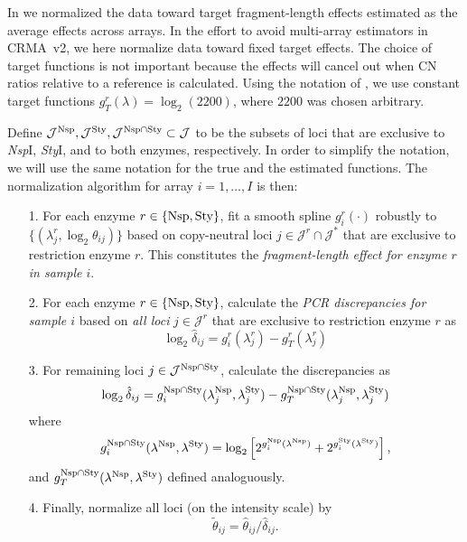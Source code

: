 \documentclass{bioinfo}
\newcommand{\NspI}{\emph{Nsp}I\xspace}
\newcommand{\StyI}{\emph{Sty}I\xspace}
\newcommand{\Nsp}{\ensuremath{\textnormal{Nsp}}\xspace}
\newcommand{\Sty}{\ensuremath{\textnormal{Sty}}\xspace}
\begin{document}
In \citet{BengtssonH_etal_2008} we normalized the data toward target fragment-length effects estimated as the average effects across arrays.  
In the effort to avoid multi-array estimators in CRMA~v2, we here normalize data toward fixed target effects.  
The choice of target functions is not important because the effects will cancel out when CN ratios relative to a reference is calculated.
Using the notation of \citet{BengtssonH_etal_2008}, we use constant target functions $g_T^r(\lambda) = \log_2(2200)$, where $2200$ was chosen arbitrary.

Define $\mathcal{J}^{\Nsp}, \mathcal{J}^{\Sty}, \mathcal{J}^{\Nsp\cap\Sty} \subset \mathcal{J}$ to be the subsets of loci that are exclusive to \NspI, \StyI, and to both enzymes, respectively.
In order to simplify the notation, we will use the same notation for the true and the estimated functions.  The normalization algorithm for array $i=1,\ldots,I$ is then:
\begin{enumerate}
 \item[1.] For each enzyme $r \in \{\Nsp, \Sty\}$, fit a smooth spline $g^{r}_{i}(\cdot)$ robustly to $\{(\lambda^{r}_{j}, \log_2\theta_{ij})\}$ based on copy-neutral loci $j \in \mathcal{J}^{r} \cap \mathcal{J^*}$ that are exclusive to restriction enzyme $r$.  This constitutes the \emph{fragment-length effect for enzyme $r$ in sample $i$}.

 \item[2.] For each enzyme $r \in \{\Nsp, \Sty\}$, calculate the \emph{PCR discrepancies for sample $i$} based on \emph{all loci} $j \in \mathcal{J}^{r}$ that are exclusive to restriction enzyme $r$ as
  \begin{equation}
    \log_2 \hat{\delta}_{ij} 
     = g^{r}_{i}(\lambda^{r}_{j}) - g^{r}_{T}(\lambda^{r}_{j})
    \label{eqnPCRbias}
  \end{equation}

 \item[3.] For remaining loci $j \in \mathcal{J}^{\Nsp\cap\Sty}$, calculate the discrepancies as
  \begin{equation}
    \log_2 \hat{\delta}_{ij} 
     = g^{\Nsp\cap\Sty}_{i}(\lambda^{\Nsp}_{j}, \lambda^{\Sty}_{j}) - g^{\Nsp\cap\Sty}_{T}(\lambda^{\Nsp}_{j}, \lambda^{\Sty}_{j})
    \label{eqnPCRbiasIIIa}
  \end{equation}
  where
  \begin{equation}
    g^{\Nsp\cap\Sty}_{i}(\lambda^{\Nsp}, \lambda^{\Sty}) = \log_2\left[
      2^{g^{\Nsp}_{i}(\lambda^{\Nsp})} + 2^{g^{\Sty}_{i}(\lambda^{\Sty})}
    \right],
    \label{eqnPCRbiasIIIb}
  \end{equation}
  and $g^{\Nsp\cap\Sty}_{T}(\lambda^{\Nsp}, \lambda^{\Sty})$ defined analoguously.


 \item[4.] Finally, normalize all loci (on the intensity scale) by
  \begin{equation}
    \tilde{\theta}_{ij} = \hat\theta_{ij} / \hat{\delta}_{ij}.
    \label{eqnPCRnorm}
  \end{equation}
\end{enumerate}
\end{document}
